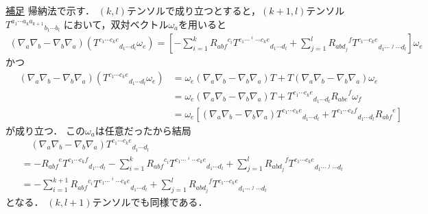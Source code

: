 \documentclass[a4paper]{jsarticle}
\begin{document}
\begin{itembox}[l]{\underline{補足}}
	帰納法で示す．
	$(k, l)$テンソルで成り立つとすると，$(k+1, l)$テンソル
	${T^{a_1 \cdots a_k a_{k+1}}}_{b_1 \cdots b_l}$
	において，双対ベクトル$\omega_a$を用いると
	\begin{align}
		\left( \nabla_a \nabla_b - \nabla_b \nabla_a \right) \left(
			{T^{c_1 \cdots c_k e}}_{d_1 \cdots d_l} \omega_e
		\right)
		= \left[ - \sum_{i=1}^k {R_{abf}}^{c_i}
			{T^{c_1 \cdots \mathop{\check{f}}^i \cdots c_k e}}_{d_1 \cdots d_l}
		+ \sum_{j=1}^l {R_{abd_j}}^f
			{T^{c_1 \cdots c_k e}}_{d_1 \cdots \mathop{\check{f}}^j \cdots d_l}
		\right] \omega_e
	\end{align}
	かつ
	\begin{align}
		\quad \left( \nabla_a \nabla_b - \nabla_b \nabla_a \right) \left(
			{T^{c_1 \cdots c_k e}}_{d_1 \cdots d_l} \omega_e
		\right)
		&= \omega_e \left( \nabla_a \nabla_b - \nabla_b \nabla_a \right) T
		+ T \left( \nabla_a \nabla_b - \nabla_b \nabla_a \right) \omega_e \\
		&= \omega_e \left( \nabla_a \nabla_b - \nabla_b \nabla_a \right) T
		+ {T^{c_1 \cdots c_k e}}_{d_1 \cdots d_l} {R_{abe}}^f \omega_f \\
		&= \omega_e \left[ 
			\left( \nabla_a \nabla_b - \nabla_b \nabla_a \right)
			{T^{c_1 \cdots c_k e}}_{d_1 \cdots d_l}
			+ {T^{c_1 \cdots c_k f}}_{d_1 \cdots d_l} {R_{abf}}^e
		\right]
	\end{align}
	が成り立つ．
	この$\omega_a$は任意だったから結局
	\begin{align}
		&\quad \left( \nabla_a \nabla_b - \nabla_b \nabla_a \right)
			{T^{c_1 \cdots c_k e}}_{d_1 \cdots d_l} \\
		&= - {R_{abf}}^e {T^{c_1 \cdots c_k f}}_{d_1 \cdots d_l}
		- \sum_{i=1}^k {R_{abf}}^{c_i}
			{T^{c_1 \cdots \mathop{\check{f}}^i \cdots c_k e}}_{d_1 \cdots d_l}
		+ \sum_{j=1}^l {R_{abd_j}}^f
			{T^{c_1 \cdots c_k e}}_{d_1 \cdots \mathop{\check{f}}^j \cdots d_l}
		\\
		&= - \sum_{i=1}^{k+1} {R_{abf}}^{c_i}
			{T^{c_1 \cdots \mathop{\check{f}}^i \cdots c_k e}}_{d_1 \cdots d_l}
		+ \sum_{j=1}^l {R_{abd_j}}^f
			{T^{c_1 \cdots c_k e}}_{d_1 \cdots \mathop{\check{f}}^j \cdots d_l}
	\end{align}
	となる．
	$(k, l+1)$テンソルでも同様である．
\end{itembox}
\end{document}
